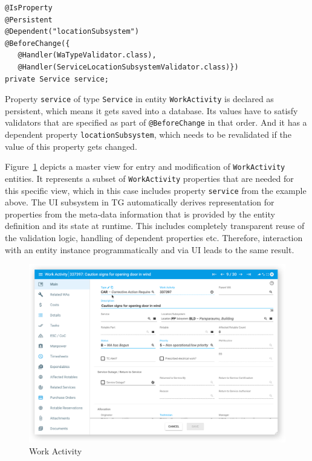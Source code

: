\documentclass[a4paper,12pt,oneside,openright,final]{memoir} %
\begin{document}
	\begin{tcolorbox}[sidebyside, righthand width=0.3\textwidth, title=Example: property declaration with multiple validators]
    \begin{lstlisting}[numbersep=2pt]
@IsProperty
@Persistent
@Dependent("locationSubsystem")
@BeforeChange({
   @Handler(WaTypeValidator.class),
   @Handler(ServiceLocationSubsystemValidator.class)})
private Service service;
    \end{lstlisting}
	
	\tcblower
		\tiny
		Property \texttt{service} of type \texttt{Service} in entity \texttt{WorkActivity} is declared as persistent, which means it gets saved into a database.
		Its values have to satisfy validators that are specified as part of \texttt{@BeforeChange} in that order.
		And it has a dependent property \texttt{locationSubsystem}, which needs to be revalidated if the value of this property gets changed.	
 	\end{tcolorbox}

	Figure~\ref{fig:wa} depicts a master view for entry and modification of \texttt{WorkActivity} entities.
	It represents a subset of \texttt{WorkActivity} properties that are needed for this specific view, which in this case includes property \texttt{service} from the example above.
	The UI subsystem in TG automatically derives representation for properties from the meta-data information that is provided by the entity definition and its state at runtime.
	This includes completely transparent reuse of the validation logic, handling of dependent properties etc.
	Therefore, interaction with an entity instance programmatically and via UI leads to the same result.
	
	\begin{figure}[!h]
  		\centering
        \includegraphics[width=1.0\textwidth]{images/01-wa-master.png}  
        \caption{Work Activity}
        \label{fig:wa}
  	\end{figure}
\end{document}
